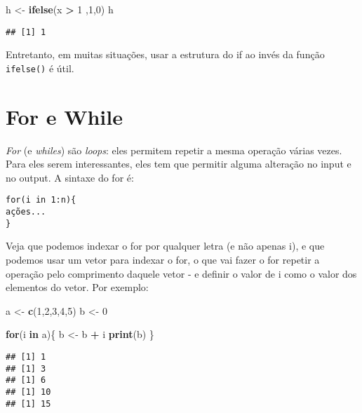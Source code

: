 \documentclass[
]{book}
\newenvironment{Shaded}{\begin{snugshade}}{\end{snugshade}}
\newcommand{\ControlFlowTok}[1]{\textcolor[rgb]{0.13,0.29,0.53}{\textbf{#1}}}
\newcommand{\DecValTok}[1]{\textcolor[rgb]{0.00,0.00,0.81}{#1}}
\newcommand{\KeywordTok}[1]{\textcolor[rgb]{0.13,0.29,0.53}{\textbf{#1}}}
\newcommand{\NormalTok}[1]{#1}
\newcommand{\OperatorTok}[1]{\textcolor[rgb]{0.81,0.36,0.00}{\textbf{#1}}}
\newcommand{\StringTok}[1]{\textcolor[rgb]{0.31,0.60,0.02}{#1}}
\begin{document}
\begin{Shaded}
\begin{Highlighting}[]
\NormalTok{h \textless{}{-}}\StringTok{ }\KeywordTok{ifelse}\NormalTok{(x }\OperatorTok{\textgreater{}}\StringTok{ }\DecValTok{1}\NormalTok{ ,}\DecValTok{1}\NormalTok{,}\DecValTok{0}\NormalTok{)}
\NormalTok{h}
\end{Highlighting}
\end{Shaded}

\begin{verbatim}
## [1] 1
\end{verbatim}

Entretanto, em muitas situações, usar a estrutura do if ao invés da função \texttt{ifelse()} é útil.

\hypertarget{for-e-while}{%
\section{For e While}\label{for-e-while}}

\emph{For} (e \emph{whiles}) são \emph{loops}: eles permitem repetir a mesma operação várias vezes. Para eles serem interessantes, eles tem que permitir alguma alteração no input e no output. A sintaxe do for é:

\begin{verbatim}
for(i in 1:n){
ações...
}
\end{verbatim}

Veja que podemos indexar o for por qualquer letra (e não apenas i), e que podemos usar um vetor para indexar o for, o que vai fazer o for repetir a operação pelo comprimento daquele vetor - e definir o valor de i como o valor dos elementos do vetor. Por exemplo:

\begin{Shaded}
\begin{Highlighting}[]
\NormalTok{a \textless{}{-}}\StringTok{ }\KeywordTok{c}\NormalTok{(}\DecValTok{1}\NormalTok{,}\DecValTok{2}\NormalTok{,}\DecValTok{3}\NormalTok{,}\DecValTok{4}\NormalTok{,}\DecValTok{5}\NormalTok{)}
\NormalTok{b \textless{}{-}}\StringTok{ }\DecValTok{0}

\ControlFlowTok{for}\NormalTok{(i }\ControlFlowTok{in}\NormalTok{ a)\{}
\NormalTok{b \textless{}{-}}\StringTok{ }\NormalTok{b }\OperatorTok{+}\StringTok{ }\NormalTok{i}
\KeywordTok{print}\NormalTok{(b)}
\NormalTok{\}}
\end{Highlighting}
\end{Shaded}

\begin{verbatim}
## [1] 1
## [1] 3
## [1] 6
## [1] 10
## [1] 15
\end{verbatim}
\end{document}
